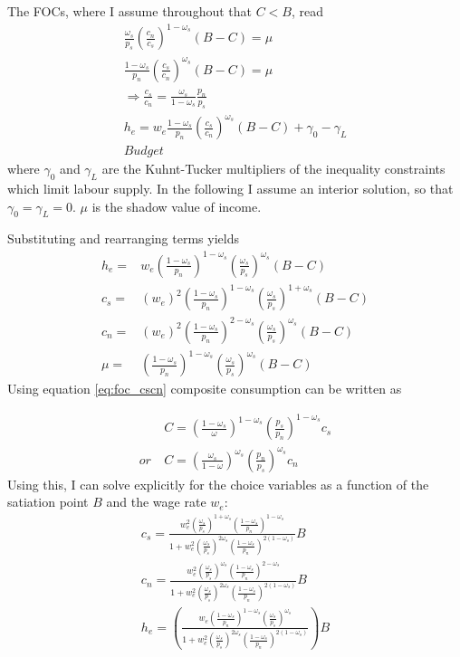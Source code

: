  The FOCs, where I  assume throughout that $C<B$, read
\begin{align}
\frac{\omega_s}{p_s}\left(\frac{c_n}{c_s}\right)^{1-\omega_s}\left(B-C\right)=\mu\\
\frac{1-\omega_s}{p_n}\left(\frac{c_s}{c_n}\right)^{\omega_s}\left(B-C\right)=\mu\\
\Rightarrow \frac{c_s}{c_n}=\frac{\omega_s}{1-\omega_s}\frac{p_n}{p_s}\label{eq:foc_cscn}\\
h_e=w_e\frac{1-\omega_s}{p_n}\left(\frac{c_s}{c_n}\right)^{\omega_s}\left(B-C\right) +\gamma_0 -\gamma_L\\
Budget
\end{align} 
where $\gamma_0$ and $\gamma_L$ are the Kuhnt-Tucker multipliers of the inequality constraints which limit labour supply. In the following I assume an interior solution, so that $\gamma_0=\gamma_L=0$. 
$\mu$ is the shadow value of income. 

Substituting and rearranging terms yields
\begin{align*}
h_e=& w_e\left(\frac{1-\omega_s}{p_n}\right)^{1-\omega_s}\left(\frac{\omega_s}{p_s}\right)^{\omega_s}(B-C)\\
c_s=&  (w_e)^2\left(\frac{1-\omega_s}{p_n}\right)^{1-\omega_s}\left(\frac{\omega_s}{p_s}\right)^{1+\omega_s}(B-C)\\
c_n=& (w_e)^2\left(\frac{1-\omega_s}{p_n}\right)^{2-\omega_s}\left(\frac{\omega_s}{p_s}\right)^{\omega_s}(B-C)\\
\mu=& \left(\frac{1-\omega_s}{p_n}\right)^{1-\omega_s}\left(\frac{\omega_s}{p_s}\right)^{\omega_s}(B-C)
\end{align*}
Using equation \ref{eq:foc_cscn} composite consumption can be written as 

\begin{align*}
&C= \left(\frac{1-\omega_s}{\omega}\right)^{1-\omega_s}\left(\frac{p_s}{p_n}\right)^{1-\omega_s}c_s\\
or\ & C= \left(\frac{\omega_s}{1-\omega}\right)^{\omega_s}\left(\frac{p_n}{p_s}\right)^{\omega_s}c_n
\end{align*} 
Using this, I can solve explicitly for the choice variables as a function of the satiation point $B$ and the wage rate $w_e$:
\begin{align}
c_s=\frac{w_e^2\left(\frac{\omega_s}{p_s}\right)^{1+\omega_s}\left(\frac{1-\omega_s}{p_n}\right)^{1-\omega_s}}{1+w_e^2\left(\frac{\omega_s}{p_s}\right)^{2\omega_s}\left(\frac{1-\omega_s}{p_n}\right)^{2(1-\omega_s)}}B\\
c_n=\frac{w_e^2\left(\frac{\omega_s}{p_s}\right)^{\omega_s}\left(\frac{1-\omega_s}{p_n}\right)^{2-\omega_s}}{1+w_e^2\left(\frac{\omega_s}{p_s}\right)^{2\omega_s}\left(\frac{1-\omega_s}{p_n}\right)^{2(1-\omega_s)}}B\\
h_e=\left(
\frac{w_e \left(\frac{1-\omega_s}{p_n}\right)^{1-\omega_s}\left(\frac{\omega_s}{p_s}\right)^{\omega_s}}{1+w_e^2\left(\frac{\omega_s}{p_s}\right)^{2\omega_s}\left(\frac{1-\omega_s}{p_n}\right)^{2(1-\omega_s)}}\right)B
\end{align}

